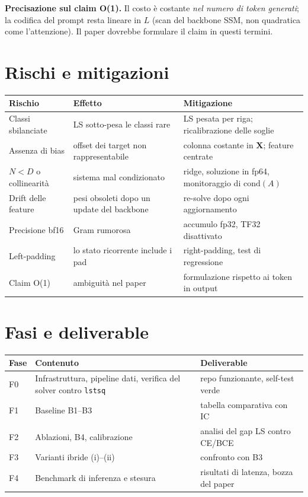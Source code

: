 \documentclass[11pt,a4paper]{article}
\newcommand{\X}{\bm{X}}
\begin{document}
\textbf{Precisazione sul claim O(1).} Il costo è costante \emph{nel numero di token generati}; la codifica del prompt resta lineare in $L$ (scan del backbone SSM, non quadratica come l'attenzione). Il paper dovrebbe formulare il claim in questi termini.

\section{Rischi e mitigazioni}

\begin{center}
\begin{tabularx}{\textwidth}{>{\raggedright\arraybackslash}p{3.6cm}LL}
\toprule
\textbf{Rischio} & \textbf{Effetto} & \textbf{Mitigazione} \\
\midrule
Classi sbilanciate & LS sotto-pesa le classi rare & LS pesata per riga; ricalibrazione delle soglie \\
Assenza di bias & offset dei target non rappresentabile & colonna costante in $\X$; feature centrate \\
$N<D$ o collinearità & sistema mal condizionato & ridge, soluzione in fp64, monitoraggio di $\mathrm{cond}(A)$ \\
Drift delle feature & pesi obsoleti dopo un update del backbone & re-solve dopo ogni aggiornamento \\
Precisione bf16 & Gram rumorosa & accumulo fp32, TF32 disattivato \\
Left-padding & lo stato ricorrente include i pad & right-padding, test di regressione \\
Claim O(1) & ambiguità nel paper & formulazione rispetto ai token in output \\
\bottomrule
\end{tabularx}
\end{center}

\section{Fasi e deliverable}

\begin{center}
\begin{tabularx}{\textwidth}{lLL}
\toprule
\textbf{Fase} & \textbf{Contenuto} & \textbf{Deliverable} \\
\midrule
F0 & Infrastruttura, pipeline dati, verifica del solver contro \texttt{lstsq} & repo funzionante, self-test verde \\
F1 & Baseline B1--B3 & tabella comparativa con IC \\
F2 & Ablazioni, B4, calibrazione & analisi del gap LS contro CE/BCE \\
F3 & Varianti ibride (i)--(ii) & confronto con B3 \\
F4 & Benchmark di inferenza e stesura & risultati di latenza, bozza del paper \\
\bottomrule
\end{tabularx}
\end{center}
\end{document}
